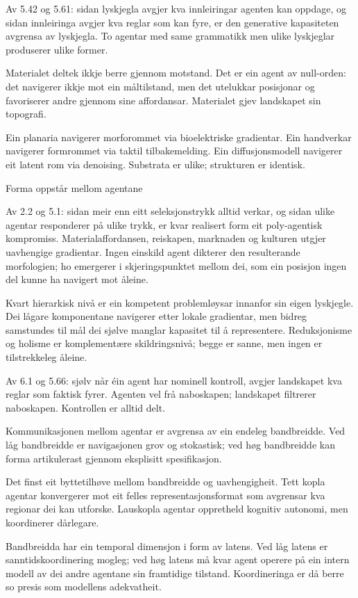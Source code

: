 \documentclass[10pt,oneside]{book}
\newlength{\propnumwidth}
\newlength{\propnumgap}
\newcommand{\prop}[3]{%
  \par\addvspace{6pt}%
  \noindent\llap{\makebox[\propnumwidth][l]{\textbf{#1}\textsuperscript{\textit{#2}}}\hspace{\propnumgap}}%
  #3\par%
  \addvspace{2pt}%
}
\begin{document}
\prop{5.67}{t}{Av 5.42 og 5.61: sidan lyskjegla avgjer kva innleiringar agenten kan oppdage, og sidan innleiringa avgjer kva reglar som kan fyre, er den generative kapasiteten avgrensa av lyskjegla. To agentar med same grammatikk men ulike lyskjeglar produserer ulike former.}
\prop{5.7}{o}{Materialet deltek ikkje berre gjennom motstand. Det er ein agent av null-orden: det navigerer ikkje mot ein måltilstand, men det utelukkar posisjonar og favoriserer andre gjennom sine affordansar. Materialet gjev landskapet sin topografi.}
\prop{5.71}{i}{Ein planaria navigerer morforommet via bioelektriske gradientar. Ein handverkar navigerer formrommet via taktil tilbakemelding. Ein diffusjonsmodell navigerer eit latent rom via denoising. Substrata er ulike; strukturen er identisk.}
\clearpage
{}
\prop{6}{}{Forma oppstår mellom agentane}
\prop{6.1}{t}{Av 2.2 og 5.1: sidan meir enn eitt seleksjonstrykk alltid verkar, og sidan ulike agentar responderer på ulike trykk, er kvar realisert form eit poly-agentisk kompromiss. Materialaffordansen, reiskapen, marknaden og kulturen utgjer uavhengige gradientar. Ingen einskild agent dikterer den resulterande morfologien; ho emergerer i skjeringspunktet mellom dei, som ein posisjon ingen del kunne ha navigert mot åleine.}
\prop{6.2}{t}{Kvart hierarkisk nivå er ein kompetent problemløysar innanfor sin eigen lyskjegle. Dei lågare komponentane navigerer etter lokale gradientar, men bidreg samstundes til mål dei sjølve manglar kapasitet til å representere. Reduksjonisme og holisme er komplementære skildringsnivå; begge er sanne, men ingen er tilstrekkeleg åleine.}
\prop{6.3}{t}{Av 6.1 og 5.66: sjølv når éin agent har nominell kontroll, avgjer landskapet kva reglar som faktisk fyrer. Agenten vel frå naboskapen; landskapet filtrerer naboskapen. Kontrollen er alltid delt.}
\prop{6.31}{o}{Kommunikasjonen mellom agentar er avgrensa av ein endeleg bandbreidde. Ved låg bandbreidde er navigasjonen grov og stokastisk; ved høg bandbreidde kan forma artikulerast gjennom eksplisitt spesifikasjon.}
\prop{6.32}{t}{Det finst eit byttetilhøve mellom bandbreidde og uavhengigheit. Tett kopla agentar konvergerer mot eit felles representasjonsformat som avgrensar kva regionar dei kan utforske. Lauskopla agentar oppretheld kognitiv autonomi, men koordinerer dårlegare.}
\prop{6.33}{o}{Bandbreidda har ein temporal dimensjon i form av latens. Ved låg latens er sanntidskoordinering mogleg; ved høg latens må kvar agent operere på ein intern modell av dei andre agentane sin framtidige tilstand. Koordineringa er då berre so presis som modellens adekvatheit.}
\end{document}
